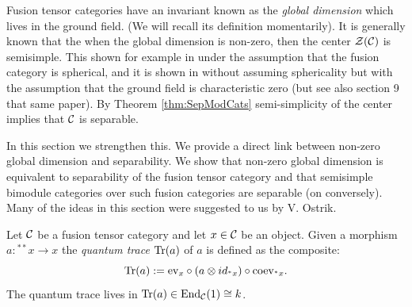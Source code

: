 \documentclass{amsart}
\begin{document}
Fusion tensor categories have an invariant known as the \emph{global dimension} which lives in the ground field. (We will recall its definition momentarily). It is generally known that the when the global dimension is non-zero, then the center $\mathcal Z(\mathcal C)$ is semisimple. This shown for example in \cite[Prop. 3.10]{MR1966525} under the assumption that the fusion category is spherical, and it is shown in \cite[Thm. 2.15]{MR2183279} without assuming sphericality but with the assumption that the ground field is characteristic zero (but see also section 9 that same paper). 
By Theorem \ref{thm:SepModCats} semi-simplicity of the center implies that $\mathcal C$ is separable. 

In this section we strengthen this. We provide a direct link between non-zero global dimension and separability. We show that non-zero global dimension is equivalent to separability of the fusion tensor category and that  semisimple bimodule categories over such fusion categories are separable (on conversely). Many of the ideas in this section were suggested to us by V. Ostrik. 

Let $\mathcal C$ be a fusion tensor category and let $x \in \mathcal C$ be an object. Given a morphism $a: {}^{**}x \to x$ the {\em quantum trace} $\mathrm{Tr}(a)$ of $a$ is defined as the composite: %
\begin{equation*}
	\mathrm{Tr}(a) := \mathrm{ev}_x \circ (a \otimes id_{{}^*x}) \circ \mathrm{coev}_{{}^*x}.
\end{equation*}
The quantum trace lives in $\mathrm{Tr}(a) \in \operatorname{End}_\mathcal C(1) \cong k$. 
\end{document}
